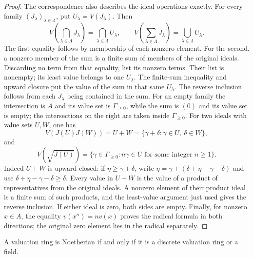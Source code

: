 \begin{proof}
The correspondence also describes the ideal operations exactly.
For every family $(J_\lambda)_{\lambda\in\Lambda}$, put
$U_\lambda=V(J_\lambda)$. Then
$$
V\left(\bigcap_{\lambda\in\Lambda}J_\lambda\right)
=\bigcap_{\lambda\in\Lambda}U_\lambda,
\qquad
V\left(\sum_{\lambda\in\Lambda}J_\lambda\right)
=\bigcup_{\lambda\in\Lambda}U_\lambda.
$$
The first equality follows by membership of each nonzero element.
For the second, a nonzero member of the sum is a finite sum of
members of the original ideals. Discarding no term from that
equality, list its nonzero terms. Their list is nonempty; its least
value belongs to one $U_\lambda$. The finite-sum inequality and
upward closure put the value of the sum in that same $U_\lambda$.
The reverse inclusion follows from each $J_\lambda$ being contained
in the sum. For an empty family the intersection is $A$ and its
value set is $\Gamma_{\geq0}$, while the sum is $(0)$ and its
value set is empty; the intersections on the right are taken
inside $\Gamma_{\geq0}$.
For two ideals with value sets $U,W$, one has
$$
V(J(U)J(W))=U+W
=\{\gamma+\delta:\gamma\in U,\ \delta\in W\},
$$
and
$$
V(\sqrt{J(U)})
=\{\gamma\in\Gamma_{\geq0}:n\gamma\in U
\text{ for some integer }n\geq1\}.
$$
Indeed $U+W$ is upward closed: if
$\eta\geq\gamma+\delta$, write
$\eta=\gamma+(\delta+\eta-\gamma-\delta)$ and use
$\delta+\eta-\gamma-\delta\geq\delta$.
Every value in $U+W$ is the value of a product of representatives
from the original ideals. A nonzero element of their product ideal
is a finite sum of such products, and the least-value argument
just used gives the reverse inclusion. If either ideal is zero,
both sides are empty. Finally, for nonzero $x\in A$, the equality
$v(x^n)=n v(x)$ proves the radical formula in both directions;
the original zero element lies in the radical separately.
\end{proof}

\begin{lemma}
\label{lemma-valuation-ring-Noetherian-discrete}
A valuation ring is Noetherian if and only if it is
a discrete valuation ring or a field.
\end{lemma}

